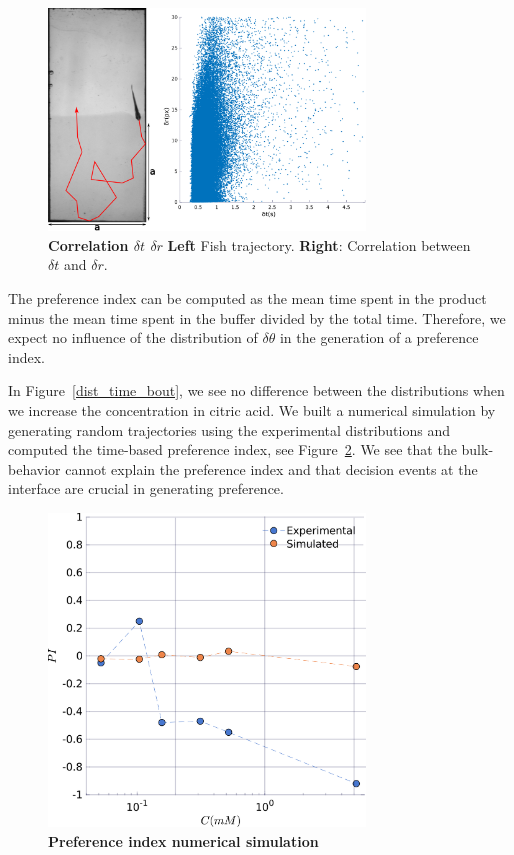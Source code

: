       \begin{figure}[h!]
        \centering
        \includegraphics[width=0.75\textwidth]{part_2/assets/random_dual.png}
        \caption{\textbf{Correlation $\delta t$ $\delta r$} \textbf{Left} Fish trajectory. \textbf{Right}: Correlation between $\delta t$ and $\delta r$.}
        \label{random_dual}
      \end{figure}

  The preference index can be computed as the mean time spent in the product minus the mean time spent in the buffer divided by the total time. Therefore, we expect no influence of the distribution of $\delta \theta$ in the generation of a preference index.

  In Figure~\ref{dist_time_bout}, we see no difference between the distributions when we increase the concentration in citric acid. We built a numerical simulation by generating random trajectories using the experimental distributions and computed the time-based preference index, see Figure~\ref{simu_pi}. We see that the bulk-behavior cannot explain the preference index and that decision events at the interface are crucial in generating preference.

      \begin{figure}[h!]
        \centering
        \includegraphics[width=0.75\textwidth]{part_2/assets/simu_pi.png}
        \caption{\textbf{Preference index numerical simulation}}
        \label{simu_pi}
      \end{figure}


